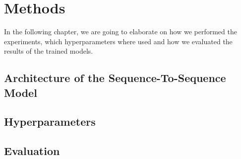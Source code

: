 \chapter{Methods}
In the following chapter, we are going to elaborate on how we performed the experiments, which hyperparameters where used and how we evaluated the results of the trained models.

\section{Architecture of the Sequence-To-Sequence Model}
\blindtext

\section{Hyperparameters}
\blindtext

\section{Evaluation}
\blindtext
